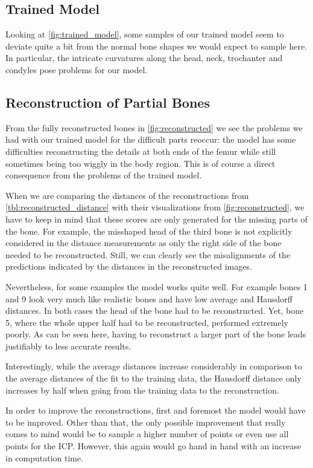 \subsection{Trained Model}
\label{subsec:trainedmodeldisc}

Looking at \autoref{fig:trained_model}, some samples of our trained model seem to deviate quite a bit from the normal bone shapes we would expect to sample here. 
In particular, the intricate curvatures along the head, neck, trochanter and condyles pose problems for our model.


\subsection{Reconstruction of Partial Bones}
\label{subsec:reconresultsdisc}

From the fully reconstructed bones in \autoref{fig:reconstructed} we see the problems we had with our trained model for the difficult parts reoccur: the model has some difficulties reconstructing the details at both ends of the femur while still sometimes being too wiggly in the body region. 
This is of course a direct consequence from the problems of the trained model.

When we are comparing the distances of the reconstructions from \autoref{tbl:reconstructed_distance} with their visualizations from \autoref{fig:reconstructed}, we have to keep in mind that these scores are only generated for the missing parts of the bone. 
For example, the misshaped head of the third bone is not explicitly considered in the distance measurements as only the right side of the bone needed to be reconstructed. 
Still, we can clearly see the misalignments of the predictions indicated by the distances in the reconstructed images.

Nevertheless, for some examples the model works quite well.
For example bones 1 and 9 look very much like realistic bones and have low average and Hausdorff distances. 
In both cases the head of the bone had to be reconstructed. 
Yet, bone 5, where the whole upper half had to be reconstructed, performed extremely poorly. 
As can be seen here, having to reconstruct a larger part of the bone leads justifiably to less accurate results.

Interestingly, while the average distances increase considerably in comparison to the average distances of the fit to the training data, the Hausdorff distance only increases by half when going from the training data to the reconstruction.

In order to improve the reconstructions, first and foremost the model would have to be improved. 
Other than that, the only possible improvement that really comes to mind would be to sample a higher number of points or even use all points for the ICP.
However, this again would go hand in hand with an increase in computation time.
